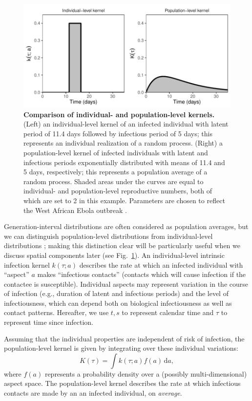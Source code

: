 \documentclass[12pt]{article}
\newcommand{\fref}[1]{Fig.~\ref{fig:#1}}
\begin{document}
\begin{figure}[!ht]
\includegraphics[width=\textwidth]{../fig/individual_and_population.pdf}
\caption{\textbf{Comparison of individual- and population-level kernels.}
(Left) an individual-level kernel of an infected individual with latent period of 11.4 days followed by infectious period of 5 days;
this represents an individual realization of a random process.
(Right) a population-level kernel of infected individuals with latent and infectious periods exponentially distributed with means of 11.4 and 5 days, respectively;
this represents a population average of a random process.
Shaded areas under the curves are equal to individual- and population-level reproductive numbers, both of which are set to 2 in this example.
Parameters are chosen to reflect the West African Ebola outbreak \citep{who2014ebola}.}
\label{fig:indpop}
\end{figure}

Generation-interval distributions are often considered as population averages, but we can distinguish population-level distributions from individual-level distributions \citep{svensson2007note, svensson2015influence}; 
making this distinction clear will be particularly useful when we discuss spatial components later (see \fref{indpop}).
An individual-level intrinsic infection kernel $k(\tau; a)$ describes the rate at which an infected individual with ``aspect'' $a$ makes ``infectious contacts'' (contacts which will cause infection if the contactee is susceptible).
Individual aspects may represent variation in the course of infection (e.g., duration of latent and infectious periods) and the level of infectiousness, which can depend both on biological infectiousness as well as contact patterns.
Hereafter, we use $t, s$ to represent calendar time and $\tau$ to
represent time since infection.

Assuming that the individual properties are independent of risk of infection, the population-level kernel is given by integrating over these individual variations:
\begin{equation}
K(\tau) = \int k (\tau; a) f(a) \,\mathrm{d}a,
\end{equation}
where $f(a)$ represents a probability density over a (possibly multi-dimensional) aspect space.
The population-level kernel describes the rate at which infectious contacts are made by an an infected individual, on \emph{average}.
\end{document}
